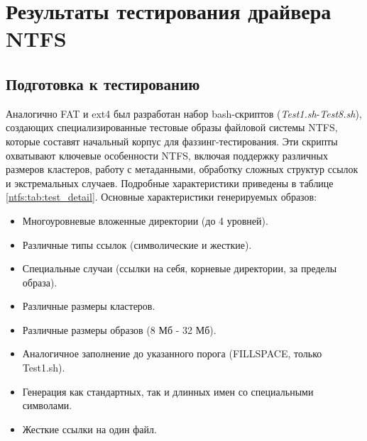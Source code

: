 \section{Результаты тестирования драйвера NTFS}

\subsection{Подготовка к тестированию}
Аналогично FAT и ext4 был разработан набор bash-скриптов (\textit{Test1.sh}-\textit{Test8.sh}), создающих специализированные тестовые образы файловой системы NTFS, которые составят начальный корпус для фаззинг-тестирования. Эти скрипты охватывают ключевые особенности NTFS, включая поддержку различных размеров кластеров, работу с метаданными, обработку сложных структур ссылок и экстремальных случаев. Подробные характеристики приведены в таблице \ref{ntfs:tab:test_detail}. Основные характеристики генерируемых образов:
\begin{itemize}
	\item Многоуровневые вложенные директории (до 4 уровней).
	\item Различные типы ссылок (символические и жесткие).
	\item Специальные случаи (ссылки на себя, корневые директории, за пределы образа).
	\item Различные размеры кластеров.
	\item Различные размеры образов (8 Мб - 32 Мб).
	\item Аналогичное заполнение до указанного порога (FILLSPACE, только Test1.sh).
	\item Генерация как стандартных, так и длинных имен со специальными символами.
	\item Жесткие ссылки на один файл.
\end{itemize} 

